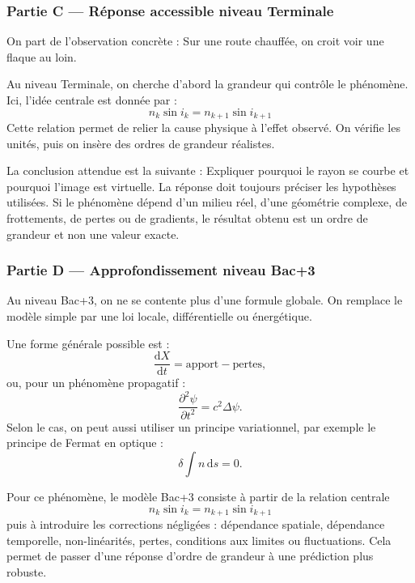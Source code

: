 \documentclass[11pt,a4paper]{article}
\begin{document}
\subsubsection*{Partie C — Réponse accessible niveau Terminale}

\begin{corrigebox}
On part de l'observation concrète : Sur une route chauffée, on croit voir une flaque au loin.

Au niveau Terminale, on cherche d'abord la grandeur qui contrôle le phénomène. Ici, l'idée centrale est donnée par :
\[
n_k\sin i_k=n_{k+1}\sin i_{k+1}
\]
Cette relation permet de relier la cause physique à l'effet observé. On vérifie les unités, puis on insère des ordres de grandeur réalistes.

La conclusion attendue est la suivante : Expliquer pourquoi le rayon se courbe et pourquoi l'image est virtuelle. La réponse doit toujours préciser les hypothèses utilisées. Si le phénomène dépend d'un milieu réel, d'une géométrie complexe, de frottements, de pertes ou de gradients, le résultat obtenu est un ordre de grandeur et non une valeur exacte.
\end{corrigebox}

\subsubsection*{Partie D — Approfondissement niveau Bac+3}

\begin{approfondissementbox}
Au niveau Bac+3, on ne se contente plus d'une formule globale. On remplace le modèle simple par une loi locale, différentielle ou énergétique.

Une forme générale possible est :
\[
\frac{\mathrm d X}{\mathrm dt}=\text{apport}-\text{pertes},
\]
ou, pour un phénomène propagatif :
\[
\frac{\partial^2 \psi}{\partial t^2}=c^2\Delta\psi.
\]
Selon le cas, on peut aussi utiliser un principe variationnel, par exemple le principe de Fermat en optique :
\[
\delta \int n\,\mathrm ds=0.
\]

Pour ce phénomène, le modèle Bac+3 consiste à partir de la relation centrale
\[
n_k\sin i_k=n_{k+1}\sin i_{k+1}
\]
puis à introduire les corrections négligées : dépendance spatiale, dépendance temporelle, non-linéarités, pertes, conditions aux limites ou fluctuations. Cela permet de passer d'une réponse d'ordre de grandeur à une prédiction plus robuste.
\end{approfondissementbox}
\end{document}

